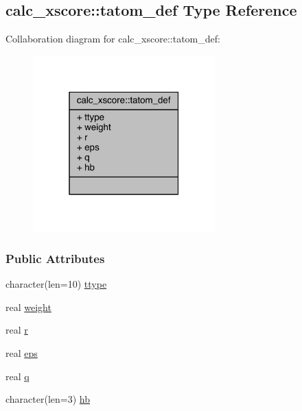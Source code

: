 \hypertarget{structcalc__xscore_1_1tatom__def}{\subsection{calc\-\_\-xscore\-:\-:tatom\-\_\-def Type Reference}
\label{structcalc__xscore_1_1tatom__def}
}


Collaboration diagram for calc\-\_\-xscore\-:\-:tatom\-\_\-def\-:
\nopagebreak
\begin{figure}[H]
\begin{center}
\leavevmode
\includegraphics[width=199pt]{structcalc__xscore_1_1tatom__def__coll__graph}
\end{center}
\end{figure}
\subsubsection*{Public Attributes}
\begin{DoxyCompactItemize}
\item 
character(len=10) \hyperlink{structcalc__xscore_1_1tatom__def_a2388c46a21d0c30719887a56a2ca521b}{ttype}
\item 
real \hyperlink{structcalc__xscore_1_1tatom__def_ad48563cb8c90dd67cbdeb3b0abafa100}{weight}
\item 
real \hyperlink{structcalc__xscore_1_1tatom__def_ac8d8103fcfce5294796cc371fdb79f98}{r}
\item 
real \hyperlink{structcalc__xscore_1_1tatom__def_a375a7c99f30092128aad0567e78414b3}{eps}
\item 
real \hyperlink{structcalc__xscore_1_1tatom__def_a8bdfd3934fe19732b05d708b333edb7c}{q}
\item 
character(len=3) \hyperlink{structcalc__xscore_1_1tatom__def_a08504825528df2912146c9396944613f}{hb}
\end{DoxyCompactItemize}


